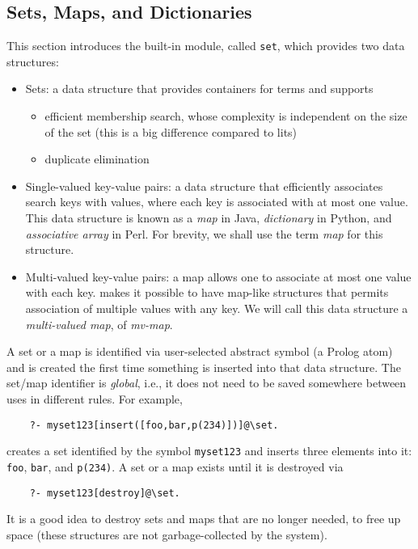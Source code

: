 
\subsection{Sets, Maps, and Dictionaries}\label{sec-data-types-set}

This section introduces the built-in \FLSYSTEM module, called
\texttt{\bs{}set}, which provides two data structures:
\begin{itemize}
\item  Sets: a data structure that provides containers for terms and
  supports 
  \begin{itemize}
  \item   efficient  membership search, whose complexity is independent on
    the size of the set (this is a big difference compared to lits)
  \item   duplicate elimination
  \end{itemize}
\item  Single-valued key-value pairs: a data structure that efficiently associates search
  keys with values, where each key is associated with at most one
  value. This data structure is known as a \emph{map} in Java,
  \emph{dictionary} in Python, and \emph{associative array} in Perl.   
  For brevity, we shall use the term \emph{map} for this structure.
\item  Multi-valued key-value pairs: a map allows one to associate at most one
  value with each key. \FLSYSTEM makes it possible to have map-like
  structures that permits association of multiple values with any key.
  We will call this data structure a \emph{multi-valued map},
  of \emph{mv-map}. 
\end{itemize}

A set or a map is identified via user-selected abstract symbol (a Prolog atom)
and is created the first time something is inserted into that data structure.
The set/map identifier is \emph{global}, i.e., it does not need to be saved
somewhere between uses in different rules. 
For example,
\begin{verbatim}
    ?- myset123[insert([foo,bar,p(234)])]@\set.
\end{verbatim}
creates a set identified by the symbol \texttt{myset123} and inserts 
three elements into it: \texttt{foo}, \texttt{bar}, and \texttt{p(234)}.   
A set or a map exists until it is destroyed via
\begin{verbatim}
    ?- myset123[destroy]@\set.
\end{verbatim}
It is a good idea to destroy sets and maps that are no longer needed, to
free up space (these structures are not garbage-collected by the system).

